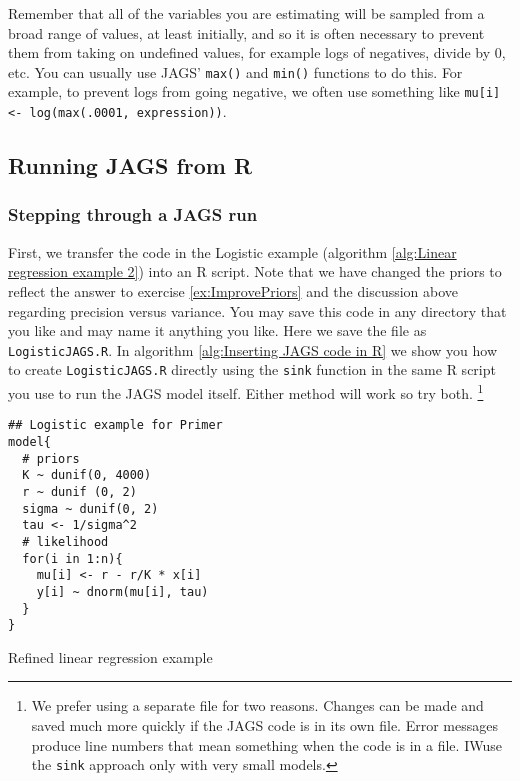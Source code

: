 \documentclass[12pt,english]{article}
\begin{document}
Remember that all of the variables you are estimating will be sampled from a broad range of values, at least initially, and so it is often necessary to prevent them from taking on undefined values, for example logs of negatives, divide by 0, etc. You can usually use JAGS' \texttt{max()} and \texttt{min()} functions to do this. For example, to prevent logs from going negative, we often use something like \texttt{mu[i] <- log(max(.0001, expression))}.

\subsection{Running JAGS from R}

\subsubsection{Stepping through a JAGS run} \label{sssec:Stepping through a JAGS run}

First, we transfer the code in the Logistic example (algorithm \ref{alg:Linear regression example 2}) into an R script. Note that we have changed the priors to reflect the answer to exercise \ref{ex:ImprovePriors} and the discussion above regarding precision versus variance. You may save this code in any directory that you like and may name it anything you like. Here we save the file as \texttt{LogisticJAGS.R}. In algorithm \ref{alg:Inserting JAGS code in R} we show you how to create \texttt{LogisticJAGS.R} directly using the \texttt{sink} function in the same R script you use to run the JAGS model itself. Either method will work so try both. \footnote{We prefer using a separate file for two reasons. Changes can be made and saved much more quickly if the JAGS code is in its own file. Error messages produce line numbers that mean something when the code is in a file. IWuse the  \texttt{sink} approach only with very small models.}

\begin{algorithm}
\begin{Verbatim}[frame=single]
## Logistic example for Primer
model{
  # priors
  K ~ dunif(0, 4000)
  r ~ dunif (0, 2)
  sigma ~ dunif(0, 2) 
  tau <- 1/sigma^2
  # likelihood
  for(i in 1:n){
    mu[i] <- r - r/K * x[i]
    y[i] ~ dnorm(mu[i], tau)
  }
}
\end{Verbatim}
\caption{Refined linear regression example}
\label{alg:Linear regression example 2}
\end{algorithm}
\end{document}
